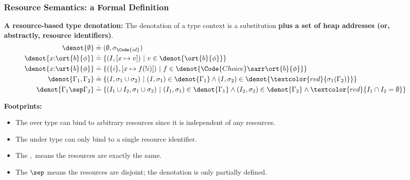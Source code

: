 \begin{frame}[fragile]
    \frametitle{Resource Semantics: a Formal Definition}

\textbf{A resource-based type denotation:} The denotation of a type context is a substitution \textbf{plus a set of heap addresses (or, abstractly, resource identifiers)}.
\begin{align*}
    \denot{\emptyset} &\doteq (\emptyset, \sigma_{\Code{id}}) \\
    \denot{x{:}\ort{b}{\phi}} &\doteq \{ (I, [x\mapsto v]) ~|~ v \in \denot{\ort{b}{\phi}} \} \\
    \denot{x{:}\urt{b}{\phi}} &\doteq \{ (\{i\}, [x\mapsto f(!i)]) ~|~ f \in \denot{\Code{Choice}\sarr \ort{b}{\phi}} \} \\
    \denot{\Gamma_1, \Gamma_2} &\doteq \{ (I, \sigma_1 \cup \sigma_2) ~|~ (I, \sigma_1) \in \denot{\Gamma_1} \land (I, \sigma_2) \in \denot{\textcolor{red}{\sigma_1(\Gamma_2)}} \} \\
    \denot{\Gamma_1 \sep \Gamma_2} &\doteq \{ (I_1 \cup I_2, \sigma_1 \cup \sigma_2) ~|~ 
    (I_1, \sigma_1) \in \denot{\Gamma_1} \land (I_2, \sigma_2) \in \denot{\Gamma_2} \land \textcolor{red}{I_1 \cap I_2 = \emptyset} \}
\end{align*}

\textbf{Footprints:}
\begin{itemize}
    \item The over type can bind to arbitrary resources since it is independent of any resources.
    \item The under type can only bind to a single resource identifier.
    \item The $,$ means the resources are exactly the same.
    \item The $\sep$ means the resources are disjoint; the denotation is only partially defined.
\end{itemize}
\end{frame}

